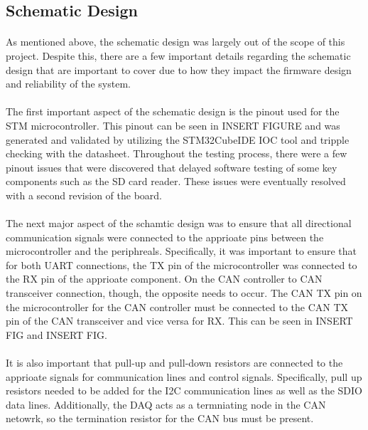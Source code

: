 \subsection{Schematic Design}

\paragraph{}
As mentioned above, the schematic design was largely out of the scope of this project.
Despite this, there are a few important details regarding the schematic design that are important to cover due to how they impact the firmware design and reliability of the system.

\paragraph{}
The first important aspect of the schematic design is the pinout used for the STM microcontroller.
This pinout can be seen in INSERT FIGURE and was generated and validated by utilizing the STM32CubeIDE IOC tool and tripple checking with the datasheet.
Throughout the testing process, there were a few pinout issues that were discovered that delayed software testing of some key components such as the SD card reader.
These issues were eventually resolved with a second revision of the board.

\paragraph{}
The next major aspect of the schamtic design was to ensure that all directional communication signals were connected to the apprioate pins between the microcontroller and the periphreals.
Specifically, it was important to ensure that for both UART connections, the TX pin of the microcontroller was connected to the RX pin of the apprioate component.
On the CAN controller to CAN transceiver connection, though, the opposite needs to occur.
The CAN TX pin on the microcontroller for the CAN controller must be connected to the CAN TX pin of the CAN transceiver and vice versa for RX.
This can be seen in INSERT FIG and INSERT FIG.

\paragraph{}
It is also important that pull-up and pull-down resistors are connected to the apprioate signals for communication lines and control signals.
Specifically, pull up resistors needed to be added for the I2C communication lines as well as the SDIO data lines.
Additionally, the DAQ acts as a termniating node in the CAN netowrk, so the termination resistor for the CAN bus must be present.

